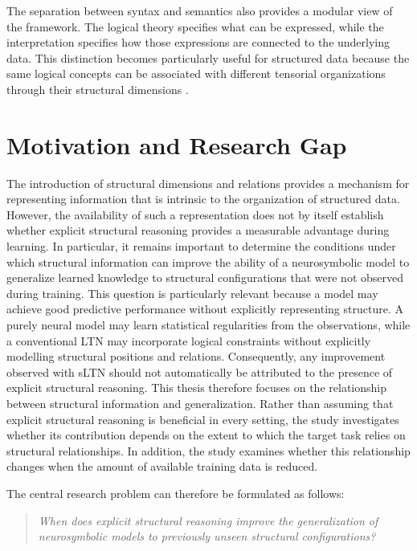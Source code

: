 The separation between syntax and semantics also provides a modular view of the framework. The logical theory specifies what can be expressed, while the interpretation specifies how those expressions are connected to the underlying data. This distinction becomes particularly useful for structured data because the same logical concepts can be associated with different tensorial organizations through their structural dimensions \cite{rinaldi2026sltn}.

\section{Motivation and Research Gap}

\noindent
The introduction of structural dimensions and relations provides a mechanism for representing information that is intrinsic to the organization of structured data. However, the availability of such a representation does not by itself establish whether explicit structural reasoning provides a measurable advantage during learning. In particular, it remains important to determine the conditions under which structural information can improve the ability of a neurosymbolic model to generalize learned knowledge to structural configurations that were not observed during training.
This question is particularly relevant because a model may achieve good predictive performance without explicitly representing structure. A purely neural model may learn statistical regularities from the observations, while a conventional LTN may incorporate logical constraints without explicitly modelling structural positions and relations. Consequently, any improvement observed with sLTN should not automatically be attributed to the presence of explicit structural reasoning.
\noindent
This thesis therefore focuses on the relationship between structural information and generalization. Rather than assuming that explicit structural reasoning is beneficial in every setting, the study investigates whether its contribution depends on the extent to which the target task relies on structural relationships. In addition, the study examines whether this relationship changes when the amount of available training data is reduced.

\noindent
The central research problem can therefore be formulated as follows:

\begin{quote}
\textit{When does explicit structural reasoning improve the generalization of neurosymbolic models to previously unseen structural configurations?}
\end{quote}

